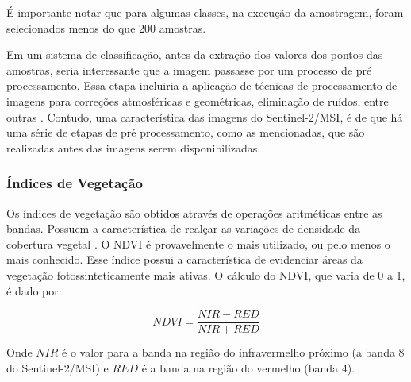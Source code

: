 É importante notar que para algumas classes, na execução da amostragem, foram selecionados menos do que 200 amostras. 

    Em um sistema de classificação, antes da extração dos valores dos pontos das amostras, seria interessante que a imagem passasse por um
processo de pré processamento. Essa etapa incluiria a aplicação de
técnicas de processamento de imagens para correções atmosféricas e
geométricas, eliminação de ruídos, entre outras \cite{lu-weng}. Contudo, uma característica das imagens do Sentinel-2/MSI, é de que há uma série de etapas de pré processamento, como as mencionadas, que são realizadas antes das imagens serem disponibilizadas. 

\subsubsection{Índices de
Vegetação}\label{indices-de-vegetacao}

	Os índices de vegetação são obtidos através de operações aritméticas
entre as bandas. Possuem a característica de realçar as variações de
densidade da cobertura vegetal \cite{meneses2012introduccao}. O NDVI é provavelmente o mais utilizado, ou pelo menos o mais conhecido. Esse índice possui a característica de evidenciar áreas da vegetação fotossinteticamente mais ativas. O cálculo do NDVI, que varia de 0 a 1, é dado por: 

\begin{equation}
NDVI = \frac{NIR - RED}{NIR + RED}
\end{equation}

Onde $NIR$ é o valor para a banda na região do infravermelho próximo
(a banda 8 do Sentinel-2/MSI) e $RED$ é a banda na região do vermelho (banda 4).

